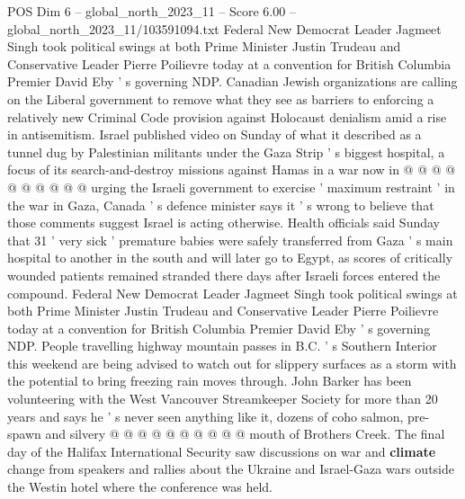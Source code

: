 \begin{textsample}{POS Dim 6 – global\_north\_2023\_11 – Score 6.00 – global\_north\_2023\_11/103591094.txt}
Federal New Democrat Leader Jagmeet Singh took political swings at both Prime Minister Justin Trudeau and Conservative Leader Pierre Poilievre today at a convention for British Columbia Premier David Eby ' s governing NDP.
Canadian Jewish organizations are calling on the Liberal government to remove what they see as barriers to enforcing a relatively new Criminal Code provision against Holocaust denialism amid a rise in antisemitism.
Israel published video on Sunday of what it described as a tunnel dug by Palestinian militants under the Gaza Strip ' s biggest hospital, a focus of its search-and-destroy missions against Hamas in a war now in @ @ @ @ @ @ @ @ @ @ urging the Israeli government to exercise ' maximum restraint ' in the war in Gaza, Canada ' s defence minister says it ' s wrong to believe that those comments suggest Israel is acting otherwise.
Health officials said Sunday that 31 ' very sick ' premature babies were safely transferred from Gaza ' s main hospital to another in the south and will later go to Egypt, as scores of critically wounded patients remained stranded there days after Israeli forces entered the compound.
Federal New Democrat Leader Jagmeet Singh took political swings at both Prime Minister Justin Trudeau and Conservative Leader Pierre Poilievre today at a convention for British Columbia Premier David Eby ' s governing NDP.
People travelling highway mountain passes in B.C. ' s Southern Interior this weekend are being advised to watch out for slippery surfaces as a storm with the potential to bring freezing rain moves through.
John Barker has been volunteering with the West Vancouver Streamkeeper Society for more than 20 years and says he ' s never seen anything like it, dozens of coho salmon, pre-spawn and silvery @ @ @ @ @ @ @ @ @ @ mouth of Brothers Creek.
The final day of the Halifax International Security saw discussions on war and \textbf{climate} change from speakers and rallies about the Ukraine and Israel-Gaza wars outside the Westin hotel where the conference was held.

\end{textsample}
